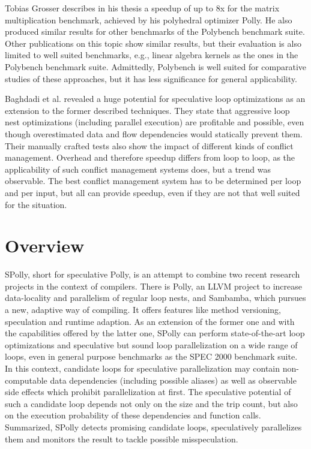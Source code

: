 Tobias Grosser describes in his thesis\cite{grosser:thesis} a speedup of up to
8x for the matrix multiplication benchmark, achieved by his polyhedral optimizer 
Polly\cite{grosser.11.impact}. He also produced similar results for other
benchmarks of the Polybench\cite{Polybench:Online} benchmark suite. 
Other publications on this 
topic\cite{Bondhugula:2008:PAP:1379022.1375595,BCBPR10,Pradelle:2012:PPB:2086696.2086718} 
show similar results, but their evaluation is also limited to well suited benchmarks,
e.g., linear algebra kernels as the ones in the Polybench benchmark suite.
Admittedly, Polybench is well suited for comparative studies of these 
approaches, but it has less significance for general applicability. 

Baghdadi et al.\cite{BCBPR10} revealed a huge potential for speculative loop 
optimizations as an extension to the former described techniques.
They state that aggressive loop nest optimizations (including 
parallel execution) are profitable and possible, even though overestimated 
data and flow dependencies would statically prevent them. 
Their manually crafted tests also show the impact of different kinds of 
conflict management. Overhead and therefore speedup differs from loop to loop,
as the applicability of such conflict management systems does,
but a trend was observable. 
The best conflict management system has to be determined per loop and per input,
but all can provide speedup, even if they are not that well suited for the
situation.



\section{Overview}

SPolly, short for speculative Polly, is an attempt to combine two recent research 
projects in the context of compilers. 
There is Polly, an LLVM project to increase data-locality
and parallelism of regular loop nests, and Sambamba, which 
pursues a new, adaptive way of compiling. It offers features like method 
versioning, speculation and runtime adaption. As an extension of the former one
and with the capabilities offered by the latter one,
SPolly can perform state-of-the-art loop optimizations and speculative but sound
loop parallelization on a wide range of loops,
even in general purpose benchmarks as the SPEC 2000 benchmark suite. 
In this context, candidate loops for speculative parallelization may
contain non-computable data dependencies (including possible aliases) 
as well as observable side effects which prohibit  parallelization at first.
The speculative potential of such a candidate loop depends not only on the size and the trip
count, but also on the execution probability of these dependencies and function calls.
Summarized, SPolly detects promising candidate loops, speculatively parallelizes
them and monitors the result to tackle possible misspeculation. 

